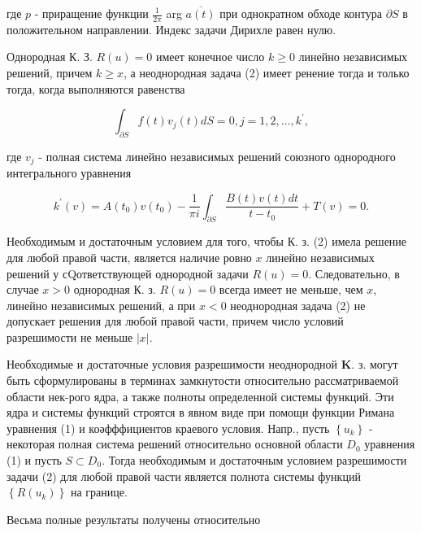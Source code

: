 \documentclass[10pt]{article}
\begin{document}
где $p$ - приращение функции $\frac{1}{2 \pi}$ arg $\overline{a(t)}$ при однократном обходе контура $\partial S$ в положительном направлении. Индекс задачи Дирихле равен нулю.



Однородная К. З. $R(u)=0$ имеет конечное число $k \geqslant 0$ линейно независимых решений, причем $k \geqslant x$, а неоднородная задача (2) имеет ренение тогда и только тогда, когда выполняются равенства



\[

\int_{\partial S} f(t) v_{j}(t) d S=0, j=1,2, \ldots, k^{\prime},

\]



где $v_{j}$ - полная система линейно независимых решений союзного однородного интегрального уравнения



\[

k^{\prime}(v)=A\left(t_{0}\right) v\left(t_{0}\right)-\frac{1}{\pi i} \int_{\partial S} \frac{B(t) v(t) d t}{t-t_{0}}+T(v)=0 .

\]



Необходимым и достаточным условием для того, чтобы К. з. (2) имела решение для любой правой части, является наличие ровно $x$ линейно независимых решений у сQответствующей однородной задачи $R(u)=0$. Следовательно, в случае $x>0$ однородная К. з. $R(u)=0$ всегда имеет не меньше, чем $x$, линейно независимых решений, а при $x<0$ неоднородная задача (2) не допускает решения для любой правой части, причем число условий разрешимости не меньше $|x|$.



Необходимые и достаточные условия разрешимости неоднородной $\boldsymbol{K}$. з. могут быть сформулированы в терминах замкнутости относительно рассматриваемой области нек-рого ядра, а также полноты определенной системы функций. Эти ядра и системы функций строятся в явном виде при помощи функции Римана уравнения (1) и коәфффициентов краевого условия. Напр., пусть $\left\{u_{k}\right\}$ - некоторая полная система решений относительно основной области $D_{0}$ уравнения (1) и пусть $S \subset D_{0}$. Тогда необходимым и достаточным условием разрешимости задачи (2) для любой правой части является полнота системы функций $\left\{R\left(u_{k}\right)\right\}$ на границе.



Весьма полные результаты получены относительно
\end{document}
